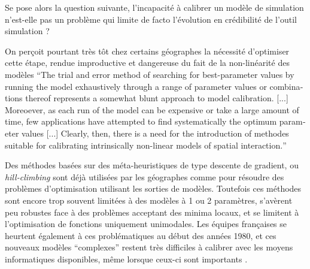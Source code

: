 Se pose alors la question suivante, l'incapacité à calibrer un modèle de simulation n'est-elle pas un problème qui limite de facto l'évolution en crédibilité de l'outil simulation ?

On perçoit pourtant très tôt chez certains géographes la nécessité d'optimiser cette étape, rendue improductive et dangereuse du fait de la non-linéarité des modèles \foreignquote{english}{The trial and error method of searching for best-parameter values by running the model exhaustively through a range of parameter values or combinations thereof represents a somewhat blunt approach to model calibration. [...] Moreoever, as each run of the model can be expensive or take a large amount of time, few applications have attempted to find systematically the optimum parameter values [...] Clearly, then, there is a need for the introduction of methodes suitable for calibrating intrinsically non-linear models of spatial interaction.} \autocite[155]{Batty1976}

Des méthodes basées sur des méta-heuristiques de type descente de gradient, ou \textit{hill-climbing} sont déjà utilisées par les géographes comme \textcite[159-160]{Batty1976} pour résoudre des problèmes d'optimisation utilisant les sorties de modèles. Toutefois ces méthodes sont encore trop souvent limitées à des modèles à 1 ou 2 paramètres, s'avèrent peu robustes face à des problèmes acceptant des minima locaux, et se limitent à l'optimisation de fonctions uniquement unimodales. Les équipes françaises se heurtent également à ces problématiques au début des années 1980, et ces nouveaux modèles \enquote{complexes} restent très difficiles à calibrer avec les moyens informatiques disponibles, même lorsque ceux-ci sont importants \autocites{Pumain1983b, Sanders1984}.

